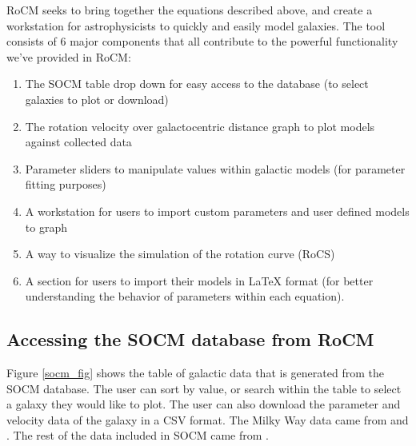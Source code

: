 \documentclass[conference]{IEEEtran}
\begin{document}
RoCM seeks to bring together the equations described above, and create a workstation for astrophysicists to quickly and easily model galaxies. The tool consists of 6 major components that all contribute to the powerful functionality we've provided in RoCM:
\begin{enumerate}
       \item The SOCM table drop down for easy access to the database (to select galaxies to plot or download)
       \item The rotation velocity over galactocentric distance graph to plot models against collected data
       \item Parameter sliders to manipulate values within galactic models (for parameter fitting purposes)
       \item A workstation for users to import custom parameters and user defined models to graph
       \item A way to visualize the simulation of the rotation curve (RoCS)
       \item A section for users to import their models in LaTeX format (for better understanding the behavior of parameters within each equation). 

\end{enumerate}



\subsection{Accessing the SOCM database from RoCM}
Figure \ref{socm_fig} shows the table of galactic data that is generated from the SOCM database. The user can sort by value, or search within the table to select a galaxy they would like to plot. The user can also download the parameter and velocity data of the galaxy in a CSV format. The Milky Way data came from \cite{kundu} and \cite{sofue}. The rest of the data included in SOCM came from \cite{mannheim}. 
\end{document}
